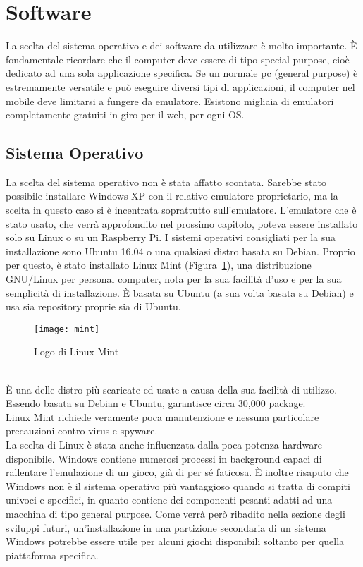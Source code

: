\section{Software}
La scelta del sistema operativo e dei software da utilizzare è molto importante. È fondamentale ricordare che il computer deve essere di tipo special purpose, cioè dedicato ad una sola applicazione specifica. Se un normale pc (general purpose) è estremamente versatile e può eseguire diversi tipi di applicazioni, il computer nel mobile deve limitarsi a fungere da emulatore. Esistono migliaia di emulatori completamente gratuiti in giro per il web, per ogni OS.
\subsection{Sistema Operativo}
La scelta del sistema operativo non è stata affatto scontata. Sarebbe stato possibile installare Windows XP con il relativo emulatore proprietario, ma la scelta in questo caso si è incentrata soprattutto sull’emulatore. L’emulatore che è stato usato, che verrà approfondito nel prossimo capitolo, poteva essere installato solo su Linux o su un Raspberry Pi. I sistemi operativi consigliati per la sua installazione sono Ubuntu 16.04 o una qualsiasi distro basata su Debian. Proprio per questo, è stato installato Linux Mint  (Figura~\ref{fig:mint}), una distribuzione GNU/Linux per personal computer, nota per la sua facilità d'uso e per la sua semplicità di installazione. È basata su Ubuntu (a sua volta basata su Debian) e usa sia repository proprie sia di Ubuntu.\\
\begin{figure}[!ht]
\texttt{[image: mint]}
\centering
\caption{Logo di Linux Mint}
\label{fig:mint}
\end{figure}
\\È una delle distro più scaricate ed usate a causa della sua facilità di utilizzo.\\Essendo basata su Debian e Ubuntu, garantisce circa 30,000 package.\\Linux Mint richiede veramente poca manutenzione e nessuna particolare precauzioni contro virus e spyware.\\La scelta di Linux è stata anche influenzata dalla poca potenza hardware disponibile. Windows contiene numerosi processi in background capaci di rallentare l’emulazione di un gioco, già di per sé faticosa. È inoltre risaputo che Windows non è il sistema operativo più vantaggioso quando si tratta di compiti univoci e specifici, in quanto contiene dei componenti pesanti adatti ad una macchina di tipo general purpose. Come verrà però ribadito nella sezione degli sviluppi futuri, un’installazione in una partizione secondaria di un sistema Windows potrebbe essere utile per alcuni giochi disponibili soltanto per quella piattaforma specifica.
